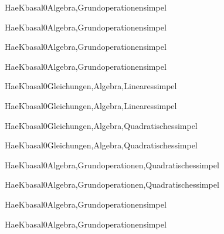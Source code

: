 \documentclass[12pt]{article}
\begin{document}
\begin{Add}{HaeK}{basal0}{Algebra,Grundoperationen}{simpel}
\solution{ }
\end{Add}
\begin{Add}{HaeK}{basal0}{Algebra,Grundoperationen}{simpel}
\end{Add}

\begin{Add}{HaeK}{basal0}{Algebra,Grundoperationen}{simpel}
\solution{ }
\end{Add}
\begin{Add}{HaeK}{basal0}{Algebra,Grundoperationen}{simpel}
\end{Add}

\begin{Add}{HaeK}{basal0}{Gleichungen,Algebra,Lineares}{simpel}
\solution{ }
\end{Add}
\begin{Add}{HaeK}{basal0}{Gleichungen,Algebra,Lineares}{simpel}
\end{Add}

\begin{Add}{HaeK}{basal0}{Gleichungen,Algebra,Quadratisches}{simpel}
\solution{ }
\end{Add}
\begin{Add}{HaeK}{basal0}{Gleichungen,Algebra,Quadratisches}{simpel}
\end{Add}

\begin{Add}{HaeK}{basal0}{Algebra,Grundoperationen,Quadratisches}{simpel}
\solution{ }
\end{Add}
\begin{Add}{HaeK}{basal0}{Algebra,Grundoperationen,Quadratisches}{simpel}
\end{Add}

\begin{Add}{HaeK}{basal0}{Algebra,Grundoperationen}{simpel}
\solution{ }
\end{Add}
\begin{Add}{HaeK}{basal0}{Algebra,Grundoperationen}{simpel}
\end{Add}
\end{document}
